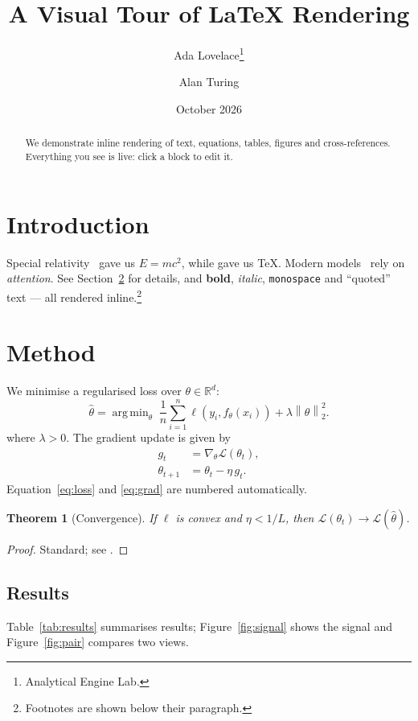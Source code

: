 \documentclass[11pt]{article}
\title{A Visual Tour of \LaTeX{} Rendering}
\author{Ada Lovelace\thanks{Analytical Engine Lab.} \and Alan Turing}
\date{October 2026}
\newcommand{\R}{\mathbb{R}}
\newcommand{\norm}[1]{\left\lVert #1 \right\rVert}
\DeclareMathOperator*{\argmin}{arg\,min}
\newtheorem{theorem}{Theorem}
\begin{document}
\maketitle

\begin{abstract}
We demonstrate inline rendering of text, equations, tables, figures and
cross-references. Everything you see is live: click a block to edit it.
\end{abstract}

\section{Introduction}\label{sec:intro}
Special relativity~\cite{einstein1905} gave us $E = mc^2$, while
\citet{knuth1984} gave us \TeX{}. Modern models~\cite{vaswani2017,knuth1984}
rely on \emph{attention}. See Section~\ref{sec:method} for details, and
\textbf{bold}, \textit{italic}, \texttt{monospace} and ``quoted'' text --- all
rendered inline.\footnote{Footnotes are shown below their paragraph.}

\section{Method}
\label{sec:method}
We minimise a regularised loss over $\theta \in \R^d$:
\begin{equation}
  \hat\theta = \argmin_{\theta} \; \frac{1}{n}\sum_{i=1}^{n} \ell(y_i, f_\theta(x_i)) + \lambda \norm{\theta}_2^2 .
  \label{eq:loss}
\end{equation}
where $\lambda > 0$. The gradient update is given by
\begin{align}
  g_t &= \nabla_\theta \mathcal{L}(\theta_t), \label{eq:grad}\\
  \theta_{t+1} &= \theta_t - \eta\, g_t. \nonumber
\end{align}
Equation~\eqref{eq:loss} and \eqref{eq:grad} are numbered automatically.

\begin{theorem}[Convergence]\label{thm:conv}
If $\ell$ is convex and $\eta < 1/L$, then $\mathcal{L}(\theta_t) \to \mathcal{L}(\hat\theta)$.
\end{theorem}

\begin{proof}
Standard; see \cite{knuth1984}.
\end{proof}

\subsection{Results}
Table~\ref{tab:results} summarises results; Figure~\ref{fig:signal} shows the
signal and Figure~\ref{fig:pair} compares two views.
\end{document}
